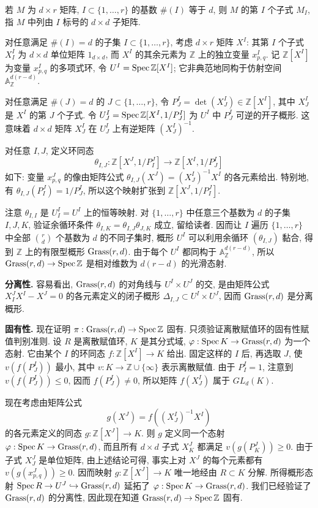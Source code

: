 若 $M$ 为 $d\times r$ 矩阵, $I\subset\{1,\ldots,r\}$ 的基数 $\#(I)$ 等于 $d$, 则 $M$ 的第 $I$ 个子式 $M_I$, 指 $M$ 中列由 $I$ 标号的 $d\times d$ 子矩阵.

对任意满足 $\#(I)=d$ 的子集 $I\subset\{1,\ldots,r\}$, 考虑 $d\times r$ 矩阵 $X^I$: 其第 $I$ 个子式 $X^I_I$ 为 $d\times d$ 单位矩阵 $1_{d\times d}$, 而 $X^I$ 的其余元素为 $\mathbb Z$ 上的独立变量 $x^I_{p,q}$. 记 $\mathbb Z[X^I]$ 为变量 $x^I_{p,q}$ 的多项式环, 令 $U^I=\operatorname{Spec}\mathbb Z[X^I]$; 它非典范地同构于仿射空间 $\mathbb A^{d(r-d)}_{\mathbb Z}$.

对任意满足 $\#(J)=d$ 的 $J\subset\{1,\ldots,r\}$, 令 $P^I_J=\det(X^I_J)\in\mathbb Z[X^I]$, 其中 $X^I_J$ 是 $X^I$ 的第 $J$ 个子式. 令 $U^I_J=\operatorname{Spec}\mathbb Z[X^I,1/P^I_J]$ 为 $U^I$ 中 $P^I_J$ 可逆的开子概形. 这意味着 $d\times d$ 矩阵 $X^I_J$ 在 $U^I_J$ 上有逆矩阵 $(X^I_J)^{-1}$.

对任意 $I,J$, 定义环同态
\[
 \theta_{I,J}:\mathbb Z[X^J,1/P^J_I]\longrightarrow\mathbb Z[X^I,1/P^I_J]
\]
如下: 变量 $x^J_{p,q}$ 的像由矩阵公式 $\theta_{I,J}(X^J)=(X^I_J)^{-1}X^I$ 的各元素给出. 特别地, 有 $\theta_{I,J}(P^J_I)=1/P^I_J$, 所以这个映射扩张到 $\mathbb Z[X^J,1/P^J_I]$.

注意 $\theta_{I,I}$ 是 $U^I_I=U^I$ 上的恒等映射. 对 $\{1,\ldots,r\}$ 中任意三个基数为 $d$ 的子集 $I,J,K$, 验证余循环条件 $\theta_{I,K}=\theta_{I,J}\theta_{J,K}$ 成立, 留给读者. 因而让 $I$ 遍历 $\{1,\ldots,r\}$ 中全部 $\binom rd$ 个基数为 $d$ 的不同子集时, 概形 $U^I$ 可以利用余循环 $(\theta_{I,J})$ 黏合, 得到 $\mathbb Z$ 上的有限型概形 $\operatorname{Grass}(r,d)$. 由于每个 $U^I$ 都同构于 $\mathbb A^{d(r-d)}_{\mathbb Z}$, 所以 $\operatorname{Grass}(r,d)\to\operatorname{Spec}\mathbb Z$ 是相对维数为 $d(r-d)$ 的光滑态射.

\textbf{分离性.}
容易看出, $\operatorname{Grass}(r,d)$ 的对角线与 $U^I\times U^J$ 的交, 是由矩阵公式 $X^J_I X^I-X^J=0$ 的各元素定义的闭子概形 $\Delta_{I,J}\subset U^I\times U^J$, 因而 $\operatorname{Grass}(r,d)$ 是分离概形.

\textbf{固有性.}
现在证明 $\pi:\operatorname{Grass}(r,d)\to\operatorname{Spec}\mathbb Z$ 固有. 只须验证离散赋值环的固有性赋值判别准则. 设 $R$ 是离散赋值环, $K$ 是其分式域, $\varphi:\operatorname{Spec} K\to\operatorname{Grass}(r,d)$ 为一个态射. 它由某个 $I$ 的环同态 $f:\mathbb Z[X^I]\to K$ 给出. 固定这样的 $I$ 后, 再选取 $J$, 使 $v(f(P^I_J))$ 最小, 其中 $v:K\to\mathbb Z\cup\{\infty\}$ 表示离散赋值. 由于 $P^I_I=1$, 注意到 $v(f(P^I_J))\leq0$, 因而 $f(P^I_J)\neq0$, 所以矩阵 $f(X^I_J)$ 属于 $GL_d(K)$.

现在考虑由矩阵公式
\[
 g(X^J)=f((X^I_J)^{-1}X^I)
\]
的各元素定义的同态 $g:\mathbb Z[X^J]\to K$. 则 $g$ 定义同一个态射 $\varphi:\operatorname{Spec} K\to\operatorname{Grass}(r,d)$, 而且所有 $d\times d$ 子式 $X^J_K$ 都满足 $v(g(P^J_K))\geq0$. 由于子式 $X^J_J$ 是单位矩阵, 由上述结论可得, 事实上对 $X^J$ 的每个元素都有 $v(g(x^J_{p,q}))\geq0$. 因而映射 $g:\mathbb Z[X^J]\to K$ 唯一地经由 $R\subset K$ 分解. 所得概形态射 $\operatorname{Spec} R\to U^J\hookrightarrow\operatorname{Grass}(r,d)$ 延拓了 $\varphi:\operatorname{Spec} K\to\operatorname{Grass}(r,d)$.
我们已经验证了 $\operatorname{Grass}(r,d)$ 的分离性, 因此现在知道 $\operatorname{Grass}(r,d)\to\operatorname{Spec}\mathbb Z$ 固有.

